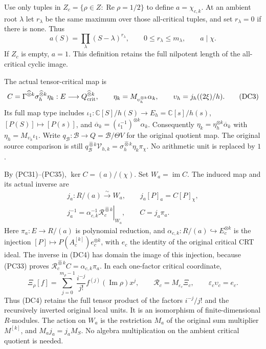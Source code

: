 \documentclass{article}
\begin{document}
Use only tuples in $Z_c=\{\rho\in Z:\operatorname{Re}\rho=1/2\}$ to
define $a=\chi_{c,k}$.  At an ambient root $\lambda$ let $r_\lambda$
be the same maximum over those all-critical tuples, and set
$r_\lambda=0$ if there is none.  Thus
\[
 a(S)=\prod_\lambda(S-\lambda)^{r_\lambda},\qquad
 0\le r_\lambda\le m_\lambda,\qquad a\mid\chi.
 \tag{DC2}
\]
If $Z_c$ is empty, $a=1$.  This definition retains the full nilpotent
length of the all-critical cyclic image.

The actual tensor-critical map is
\[
 C=\Gamma^{\widehat\otimes k}\sigma_h^{\widehat\otimes k}\eta_k:
 E\longrightarrow Q_{\rm crit}^{\widehat\otimes k},\qquad
 \eta_k=M_{\upsilon_h^{\otimes k}}\alpha_k,\qquad
 \upsilon_h=j_h((2\xi)/h).
 \tag{DC3}
\]
Its full map type includes
$\iota_1:\mathbb C[S]/h(S)\to E_h=\mathbb C[s]/h(s)$,
$[P(S)]\mapsto[P(s)]$, and
$\overline\alpha_k=(\iota_1^{-1})^{\otimes k}\alpha_k$.
Consequently $\eta_k=\eta_h^{\otimes k}\overline\alpha_k$ with
$\eta_h=M_{\upsilon_h}\iota_1$.
Write $q_{\mathscr B}:\mathscr B\to Q=\mathscr B/\Theta V$
for the original quotient map.  The original source comparison is still
$q_{\mathscr B}^{\widehat\otimes k}\mathcal V_{h,k}
=\sigma_h^{\widehat\otimes k}\eta_k\pi_\chi$.
No arithmetic unit is replaced by $1$.

By (PC31)--(PC35), $\ker C=(a)/(\chi)$.  Set $W_a=\operatorname{im}C$.
The induced map and its actual inverse are
\[
 \begin{gathered}
 j_a:R/(a)\xrightarrow{\sim}W_a,\qquad
 j_a[P]_a=C[P]_\chi,\\
 j_a^{-1}
 =\alpha_{c,k}^{-1}
   \left.\mathcal R_c^{\widehat\otimes k}\right|_{W_a},
 \qquad C=j_a\pi_a .
 \end{gathered}
 \tag{DC4}
\]
Here $\pi_a:E\to R/(a)$ is polynomial reduction, and
$\alpha_{c,k}:R/(a)\hookrightarrow E_c^{\otimes k}$ is the injection
$[P]\mapsto P(A_c^{[k]})e_c^{\otimes k}$, with $e_c$ the identity of
the original critical CRT ideal.  The inverse in (DC4) has domain the
image of this injection, because (PC33) proves
$\mathcal R_c^{\widehat\otimes k}C=\alpha_{c,k}\pi_a$.
In each one-factor critical coordinate,
\[
 \Xi_\rho[f]=
 \sum_{j=0}^{m_\rho-1}\frac{i^{-j}}{j!}f^{(j)}(\operatorname{Im}\rho)x^j,
 \qquad
 \mathcal R_c=M_{\varepsilon_c}\Xi_c,\qquad
 \varepsilon_c\upsilon_c=e_c .
 \tag{DC5}
\]
Thus (DC4) retains the full tensor product of the factors
$i^{-j}/j!$ and the recursively inverted original local units.
It is an isomorphism of finite-dimensional $R$-modules.  The action on
$W_a$ is the restriction $M_a$ of the original sum multiplier
$M^{[k]}$, and $M_a j_a=j_a M_S$.  No algebra multiplication on the
ambient critical quotient is needed.
\end{document}
